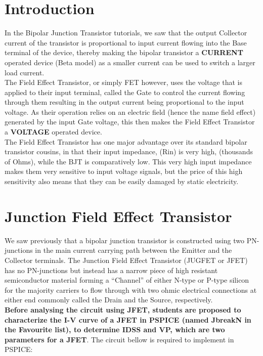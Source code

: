 
\section{Introduction}
In the Bipolar Junction Transistor  tutorials, we saw that the output Collector current of the transistor is proportional to input current flowing into the Base terminal of the device, thereby making the bipolar transistor a \textbf{CURRENT} operated device (Beta model) as a smaller current can be used to switch a larger load current.\\

The Field Effect Transistor, or simply FET however, uses the voltage that is applied to their input terminal, called the Gate to control the current flowing through them resulting in the output current being proportional to the input voltage. As their operation relies on an electric field (hence the name field effect) generated by the input Gate voltage, this then makes the Field Effect Transistor a \textbf{VOLTAGE} operated device.\\

The Field Effect Transistor has one major advantage over its standard bipolar transistor cousins, in that their input impedance, (Rin) is very high, (thousands of Ohms), while the BJT is comparatively low. This very high input impedance makes them very sensitive to input voltage signals, but the price of this high sensitivity also means that they can be easily damaged by static electricity.

\section{Junction Field Effect Transistor}
We saw previously that a bipolar junction transistor is constructed using two PN-junctions in the main current carrying path between the Emitter and the Collector terminals. The Junction Field Effect Transistor (JUGFET or JFET) has no PN-junctions but instead has a narrow piece of high resistant semiconductor material forming a “Channel” of either N-type or P-type silicon for the majority carriers to flow through with two ohmic electrical connections at either end commonly called the Drain and the Source, respectively.\\

\textbf{Before analysing the circuit using JFET, students are proposed to characterize the I-V curve of a JFET in PSPICE (named \textbf{JbreakN in the Favourite list}), to determine IDSS and VP, which are two parameters for a JFET}. The circuit bellow is required to implement in PSPICE:

